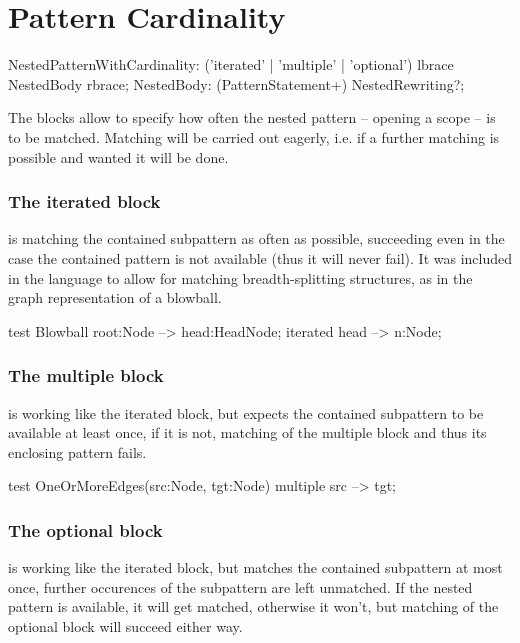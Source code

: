   
\section{Pattern Cardinality}
\label{cardinality}

\begin{rail}  
  NestedPatternWithCardinality: 
    ('iterated' | 'multiple' | 'optional') lbrace NestedBody rbrace;
  NestedBody: (PatternStatement+) NestedRewriting?;
\end{rail}

The  blocks allow to specify how often the nested pattern -- opening a scope -- is to be matched. Matching will be carried out eagerly, i.e. if a further matching is possible and wanted it will be done. 
\subsubsection*{The iterated block} 
is matching the contained subpattern as often as possible, succeeding even in the case the contained pattern is not available (thus it will never fail). It was included in the language to allow for matching breadth-splitting structures, as in the graph representation of a blowball.

\begin{example}
  \begin{grgen}
test Blowball {
  root:Node --> head:HeadNode;
  iterated {
    head --> n:Node;
  }  
}
  \end{grgen}
\end{example}

\subsubsection*{The multiple block}
is working like the iterated block, but expects the contained subpattern to be available at least once, if it is not, matching of the multiple block and thus its enclosing pattern fails.

\begin{example}
  \begin{grgen}
test OneOrMoreEdges(src:Node, tgt:Node)
{
  multiple {
    src --> tgt;
  }
}
  \end{grgen}
\end{example}

\subsubsection*{The optional block}
is working like the iterated block, but matches the contained subpattern at most once, further occurences of the subpattern are left unmatched.
If the nested pattern is available, it will get matched, otherwise it won't, but matching of the optional block will succeed either way.

